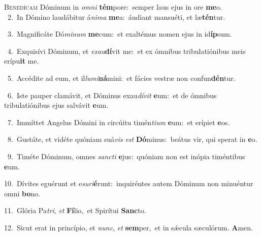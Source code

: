 \lettrine{\initial\textcolor{\initialcolor}{B}}{enedícam} Dóminum in \textit{om}\-\textit{ni} \textbf{tém}\-pore:~\star semper laus ejus in ore \textbf{me}\-o.\\
{\numbfont\textcolor{\numbcolor}{~2.}}~In Dómino laudábitur á\-\textit{ni}\-\textit{ma} \textbf{me}\-a:~\star áudiant mansuéti, et læ\-\textbf{tén}\-tur.\par
{\numbfont\textcolor{\numbcolor}{~3.}}~Magnificáte Dó\-\textit{mi}\-\textit{num} \textbf{me}\-cum:~\star et exaltémus nomen ejus in id\-\textbf{íp}\-sum.\par
{\numbfont\textcolor{\numbcolor}{~4.}}~Exquisívi Dóminum, et \textit{ex}\-\textit{au}\textbf{dí}vit me:~\star et ex ómnibus tribulatiónibus meis erípu\textbf{it} me.\par
{\numbfont\textcolor{\numbcolor}{~5.}}~Accédite ad eum, et il\-\textit{lu}\-\textit{mi}\textbf{ná}mini:~\star et fácies vestræ non confun\-\textbf{dén}\-tur.\par
{\numbfont\textcolor{\numbcolor}{~6.}}~Iste pauper clamávit, et Dóminus exau\-\textit{dí}\-\textit{vit} \textbf{e}\-um:~\star et de ómnibus tribulatiónibus ejus salvávit \textbf{e}\-um.\par
{\numbfont\textcolor{\numbcolor}{~7.}}~Immíttet Angelus Dómini in circúitu timén\-\textit{ti}\-\textit{um} \textbf{e}\-um:~\star et erípiet \textbf{e}\-os.\par
{\numbfont\textcolor{\numbcolor}{~8.}}~Gustáte, et vidéte quóniam suá\textit{vis} \textit{est} \textbf{Dó}\-minus:~\star beátus vir, qui sperat in \textbf{e}\-o.\par
{\numbfont\textcolor{\numbcolor}{~9.}}~Timéte Dóminum, omnes \textit{sanc}\-\textit{ti} \textbf{e}\-jus:~\star quóniam non est inópia timéntibus \textbf{e}\-um.\par
{\numbfont\textcolor{\numbcolor}{10.}}~Dívites eguérunt et e\-\textit{su}\-\textit{ri}\textbf{é}runt:~\star inquiréntes autem Dóminum non minuéntur omni \textbf{bo}\-no.\par
{\numbfont\textcolor{\numbcolor}{11.}}~Glória Pa\-\textit{tri}\-, \textit{et} \textbf{Fí}\-lio,~\star et Spirítui \textbf{Sanc}\-to.\par
{\numbfont\textcolor{\numbcolor}{12.}}~Sicut erat in princípio, et \textit{nunc}\-, \textit{et} \textbf{sem}\-per,~\star et in sǽcula sæculórum. \textbf{A}\-men.\par
